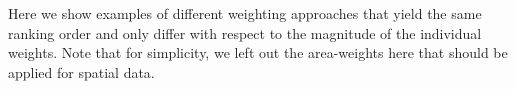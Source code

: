 

\section{}\label{sec:appendix-B}

Here we show examples of different weighting approaches that yield the same ranking order and only differ with respect to the magnitude of the individual weights. Note that for simplicity, we left out the area-weights here that should be applied for spatial data.

